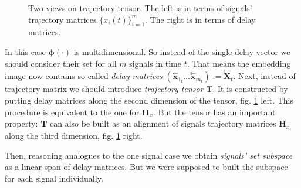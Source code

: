 \documentclass[referee, pdflatex]{sn-jnl}
\theoremstyle{definition}
\theoremstyle{plain}
\newcommand{\delayV}[1]{\overset{\leftarrow}{\mathbf{x}}_{#1}}
\newcommand{\delayM}[1]{\overset{\leftarrow}{\mathbf{X}}_{#1}}
\begin{document}
	\begin{figure}[h]
		\centering
		
		\caption{Two views on trajectory tensor. The left is in terms of signals' trajectory matrices $ \{x_i(t)\}_{i=1}^m $. The right is in terms of delay matrices.}\label{pic:traj_tensor}
	\end{figure}
	
	In this case $ \boldsymbol{\phi}(\cdot) $ is multidimensional. So instead of the single delay vector we should consider their set for all $ m $ signals in time $ t $. That means the embedding image now contains so called \emph{delay matrices} $ ( \delayV{1_t} \ldots \delayV{m_t} ) := \delayM{t} $. Next, instead of trajectory matrix we should introduce \textit{trajectory tensor} $ \mathbf{T} $. It is constructed  by putting delay matrices along the second dimension of the tensor, fig. \ref{pic:traj_tensor} left. This procedure is equivalent to the one for $ \mathbf{H}_x $. But the tensor has an important property: $ \mathbf{T} $ can also be built as an alignment of signals trajectory matrices $ \mathbf{H}_{x_i} $ along the third dimension, fig. \ref{pic:traj_tensor} right.
	
	Then, reasoning analogues to the one signal case we obtain \emph{signals' set subspace} as a linear span of delay matrices. But we were supposed to built the subspace for each signal individually.
	
\end{document}
